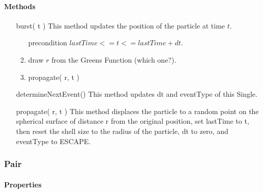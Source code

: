 \documentclass[english]{article}
\begin{document}
\paragraph{Methods}

\begin{itemize}
\item[burst( t )] This method updates the position of the particle at
  time $t$.
  \begin{enumerate}
  \item[precondition] $lastTime <= t <= lastTime + dt$.

    \item draw $r$ from the Greens Function (which one?).

    \item propagate( r, t )
  \end{enumerate}

\item[determineNextEvent()] This method updates dt and eventType of
  this Single.


\item[propagate( r, t )] This method displaces the particle to a
  random point on the spherical surface of distance r from the
  original position, set lastTime to t, then reset the shell size to
  the radius of the particle, dt to zero, and eventType to ESCAPE.

\end{itemize}

\subsubsection{Pair}

\paragraph{Properties}
\end{document}
